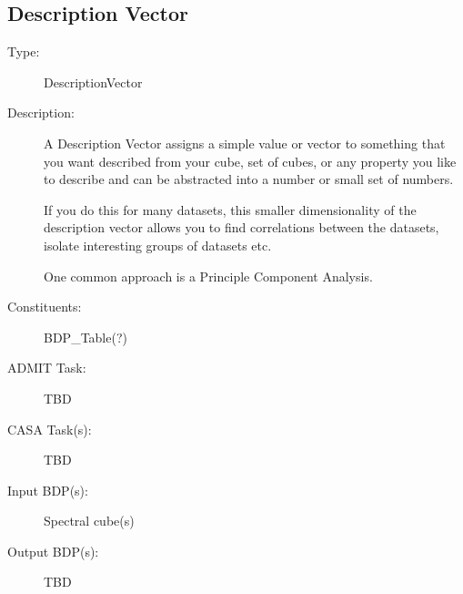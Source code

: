 \subsection{Description Vector}
\begin{description}
\item[Type:] DescriptionVector
\item[Description:]

A Description Vector assigns a simple value or vector to something
that you want described from your cube, set of cubes, or any property
you like to describe and can be abstracted into a number or small set
of numbers.

If you do this for many datasets, this smaller dimensionality of the
description vector allows you to find correlations between the datasets,
isolate interesting groups of datasets etc.

One common approach is a Principle Component Analysis.

\item[Constituents:] BDP\_Table(?)

\item[ADMIT Task:] TBD

\item[CASA Task(s):] TBD

\item[Input BDP(s):] Spectral cube(s)

\item[Output BDP(s):] TBD
\end{description}
